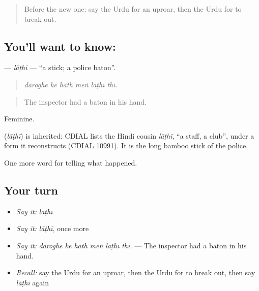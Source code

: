 \label{lesson:UR-C304-lathi}



\begin{quote}
Before the new one: say the Urdu for an uproar, then the Urdu for to break out.
\end{quote}

\subsection*{You'll want to know: }
\textbf{} — \emph{lāṭhī} — \textquotedblleft{}a stick; a police baton\textquotedblright{}.

\begin{quote}
     
\end{quote}

\begin{quote}
\emph{dāroghe ke hāth meṅ lāṭhī thī.}
\end{quote}

\begin{quote}
The inspector had a baton in his hand.
\end{quote}

Feminine.

\begin{cousinweb}
\textbf{} (\emph{lāṭhī}) is inherited: CDIAL lists the Hindi cousin \emph{lāṭhī}, \textquotedblleft{}a staff, a club\textquotedblright{}, under a form it reconstructs (CDIAL 10991). It is the long bamboo stick of the police.
\end{cousinweb}

\begin{grammarlens}[title={What you've built}]
One more word for telling what happened.
\end{grammarlens}

\subsection*{Your turn}
\begin{itemize}
\raggedright
  \item \emph{Say it:} \emph{lāṭhī}
  \item \emph{Say it:} \emph{lāṭhī}, once more
  \item \emph{Say it:} \emph{dāroghe ke hāth meṅ lāṭhī thī.} — The inspector had a baton in his hand.
  \item \emph{Recall:} say the Urdu for an uproar, then the Urdu for to break out, then say \emph{lāṭhī} again
\end{itemize}

